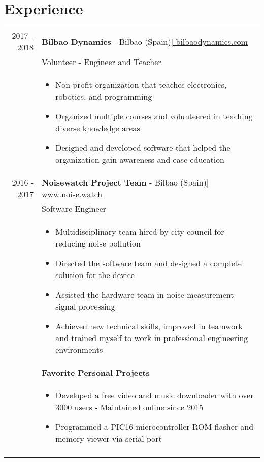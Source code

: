 \documentclass[a4paper,10pt]{article}
\begin{document}
\section{Experience}
\begin{tabular}{rp{13.6cm}}

 \textsc{2017 - 2018}& \textbf{Bilbao Dynamics} - Bilbao (Spain)\href{https://bilbaodynamics.com/}{\hfill | \footnotesize bilbaodynamics.com}\\
 & Volunteer - Engineer and Teacher \\ 
 & \footnotesize{ \begin{itemize}[noitemsep,topsep=-10pt]
 \vspace{-0.1in}
 \item Non-profit organization that teaches electronics, robotics, and programming
 \item Organized multiple courses and volunteered in teaching diverse knowledge areas
 \item Designed and developed software that helped the organization gain awareness and ease education

 \end{itemize}} \\



 \textsc{2016 - 2017}& \textbf{Noisewatch Project Team} - Bilbao (Spain)\href{http://noise.watch}{\hfill | \footnotesize www.noise.watch}\\
 & Software Engineer \\
 & \footnotesize{ \begin{itemize}[noitemsep,topsep=40pt,nolistsep]
 \vspace{-0.1in}
 \item Multidisciplinary team hired by city council for reducing noise pollution
 \item Directed the software team and designed a complete solution for the device
 \item Assisted the hardware team in noise measurement signal processing
 \item Achieved new technical skills, improved in teamwork and trained myself to work in professional engineering environments
 \end{itemize}} \\

 \textsc{}& \textbf{Favorite Personal Projects} \\
 & \footnotesize{ \begin{itemize}[noitemsep,topsep=-10pt]
 \vspace{-0.1in}
 \item Developed a free video and music downloader with over 3000 users - Maintained online since 2015
 \item Programmed a PIC16 microcontroller ROM flasher and memory viewer via serial port
 \end{itemize}} \\&\\
 

\end{tabular}
\end{document}
